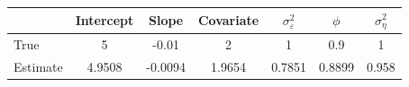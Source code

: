 \begin{tabular}{lcccccc}
\toprule
& Intercept & Slope & Covariate & $\sigma_\varepsilon^2$ & $\phi$ & $\sigma_\eta^2$ \\
\midrule
True & 5 & -0.01 & 2 & 1 & 0.9 & 1 \\
Estimate & 4.9508 & -0.0094 & 1.9654 & 0.7851 & 0.8899 & 0.958 \\
\bottomrule
\end{tabular}

